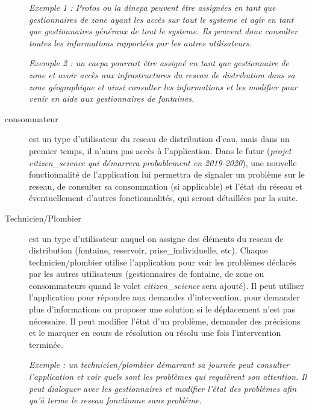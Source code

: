 \documentclass[a4paper, 11pt]{article}
\begin{document}
\begin{description}
    \emph{Exemple 1 : Protos ou la \gls{dinepa} peuvent être assignées en tant que gestionnaires de \gls{zone} ayant les accès sur tout le \gls{systeme} et agir en tant que gestionnaires généraux de tout le \gls{systeme}. Ils peuvent donc consulter toutes les informations rapportées par les autres \glspl{utilisateur}.}

    \emph{Exemple 2 : un \gls{caepa} pourrait être assigné en tant que gestionnaire de \gls{zone} et avoir accès aux infrastructures du \gls{reseau} de distribution dans sa \gls{zone} géographique et ainsi consulter les informations et les modifier pour venir en aide aux gestionnaires de \glspl{fontaine}.}

    \item[\Ac{consommateur}] est un type d'\gls{utilisateur} du \gls{reseau} de distribution d'eau, mais dans un premier temps, il n'aura pas accès à l'\gls{application}. Dans le futur (\emph{projet \gls{citizen_science} qui démarrera probablement en 2019-2020}), une nouvelle fonctionnalité de l'\gls{application} lui permettra de signaler un problème sur le \gls{reseau}, de consulter sa consommation (si applicable) et l'état du réseau et éventuellement d'autres fonctionnalités, qui seront détaillées par la suite.

    \item[Technicien/Plombier] est un type d'\gls{utilisateur} auquel on assigne des éléments du \gls{reseau} de distribution (\gls{fontaine}, \gls{reservoir}, \gls{prise_individuelle}, etc). Chaque technicien/plombier utilise l'\gls{application} pour voir les problèmes déclarés par les autres \glspl{utilisateur} (gestionnaires de \gls{fontaine}, de \gls{zone} ou \glspl{consommateur} quand le volet \emph{\gls{citizen_science}} sera ajouté). Il peut utiliser l'\gls{application} pour répondre aux demandes d'intervention, pour demander plus d'informations ou proposer une solution si le déplacement n'est pas nécessaire. Il peut modifier l'état d'un problème, demander des précisions et le marquer en cours de résolution ou résolu une fois l'intervention terminée.

    \emph{Exemple : un technicien/plombier démarrant sa journée peut consulter l'\gls{application} et voir quels sont les problèmes qui requièrent son attention. Il peut dialoguer avec les gestionnaires et modifier l'état des problèmes afin qu'à terme le \gls{reseau} fonctionne sans problème.}

  \end{description}
\end{document}
